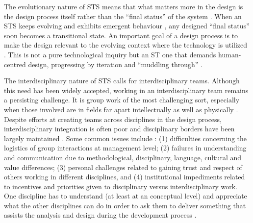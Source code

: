 The evolutionary nature of STS means that what matters more in the design is the design process itself rather than the ``final status'' of the system \cite{Shin2014}. When an STS keeps evolving and exhibits emergent behaviour \cite{Nikolic2009}, any designed ``final status'' soon becomes a transitional state. An important goal of a design process is to make the design relevant to the evolving context where the technology is utilized \cite{Shin2014}. This is not a pure technological inquiry but an ST one that demands human-centred design, progressing by iteration and ``muddling through'' \cite{Norman2015}. 

The interdisciplinary nature of STS calls for interdisciplinary teams. Although this need has been widely accepted, working in an interdisciplinary team remains a persisting challenge. 
It is group work of the most challenging sort, especially when those involved are in fields far apart intellectually as well as physically \cite{Brewer1999}. 
Despite efforts at creating teams across disciplines in the design process, interdisciplinary integration is often poor and disciplinary borders have been largely maintained \cite{Baxter2011}. Some common issues include \cite{Baxter2011,Brewer1999,Norman2015}: (1) difficulties concerning the logistics of group interactions at management level; (2) failures in understanding and communication due to methodological, disciplinary, language, cultural and value differences; (3) personal challenges related to gaining trust and respect of others working in different disciplines, and (4) institutional impediments related to incentives and priorities given to disciplinary versus interdisciplinary work.
% 
One discipline has to understand (at least at an conceptual level) and appreciate what the other disciplines can do in order to ask them to deliver something that assists the analysis and design during the development process \cite{Baxter2011}. 


